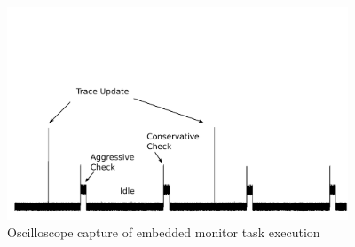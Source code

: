 \begin{figure}
\includegraphics[width=4in]{img/scope_annotated}
\caption{Oscilloscope capture of embedded monitor task execution \label{fig:arch:oscope}}
\end{figure}
